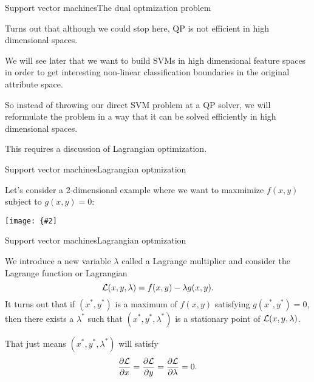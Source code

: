 \documentclass{beamer}
\newcommand{\myfig}[3]{\centerline{\texttt{[image: \{\#2]}}}
    \centerline{\scriptsize #3}}
\begin{document}
\begin{frame}{Support vector machines}{The dual optmization problem}

  Turns out that although we could stop here, QP is \alert{not efficient in
    high dimensional spaces}.

  \medskip

  We will see later that we want to build SVMs in high dimensional
  feature spaces in order to get interesting non-linear classification
  boundaries in the original attribute space.

  \medskip

  So instead of throwing our direct
  SVM problem at a QP solver, we will reformulate
  the problem in a way that it can be solved efficiently in high dimensional
  spaces.

  \medskip

  This requires a discussion of Lagrangian optimization.

\end{frame}


\begin{frame}{Support vector machines}{Lagrangian optmization}

  Let's consider a 2-dimensional example where we want to maxmimize
  $f(x,y)$ subject to $g(x,y)=0$:

  \myfig{3.2in}{lagrange}{\url{https://en.wikipedia.org/wiki/Lagrange_multiplier}}

\end{frame}


\begin{frame}{Support vector machines}{Lagrangian optmization}

  We introduce a new variable $\lambda$ called a \alert{Lagrange multiplier}
  and consider the \alert{Lagrange function} or \alert{Lagrangian}
  \[ {\cal L}(x,y,\lambda) = f(x,y) - \lambda g(x,y). \]
  It turns out that if $(x^*,y^*)$ is a maximum of $f(x,y)$ satisfying
  $g(x^*,y^*)=0$, then there exists a $\lambda^*$ such that
  $(x^*,y^*,\lambda^*)$ is a \alert{stationary point} of ${\cal
    L}(x,y,\lambda)$.

  \medskip

  That just means $(x^*,y^*,\lambda^*)$ will satisfy
  \[ \frac{\partial {\cal L}}{\partial x} = \frac{\partial {\cal L}}{\partial y} = \frac{\partial {\cal L}}{\partial \lambda} = 0. \]
  
\end{frame}
\end{document}
